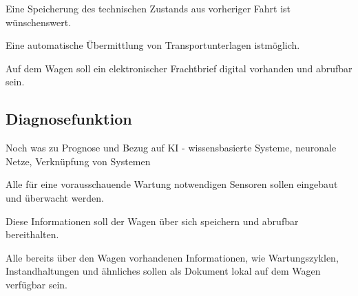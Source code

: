 \begin{feat}
Eine Speicherung des technischen Zustands aus vorheriger Fahrt ist \newline wünschenswert.
\end{feat}
\begin{feat}
Eine automatische Übermittlung von Transportunterlagen ist\newline möglich.
\end{feat}
\begin{feat}
Auf dem Wagen soll ein elektronischer Frachtbrief digital vorhanden und abrufbar sein.
\end{feat}

\subsection{Diagnosefunktion}
Noch was zu Prognose und Bezug auf KI - wissensbasierte Systeme, neuronale Netze, Verknüpfung von Systemen
\begin{feat}
Alle für eine vorausschauende Wartung notwendigen Sensoren sollen eingebaut und überwacht werden.
\end{feat}
\begin{comment}
\begin{rem} [zu Anf. 56]
Beispiele dafür sind:
\begin{itemize}
    \item Lagertemperaturüberwachung
    \item Stoßüberwachung
    \item Laufleistung
    \item Drehkugelpfanne am Drehgestell
    \item Bremsbelagüberwachung
    \item Lagerzustände
    \item Flachstellen
    \item Entgleisungssicherheit aufgrund von Beladung
\end{itemize}
\end{rem}
\end{comment}
\begin{feat}
Diese Informationen soll der Wagen über sich speichern und abrufbar bereithalten.
\end{feat}
\begin{feat}
Alle bereits über den Wagen vorhandenen Informationen, wie Wartungszyklen, Instandhaltungen und ähnliches sollen als Dokument lokal auf dem Wagen  verfügbar sein.
\end{feat}

